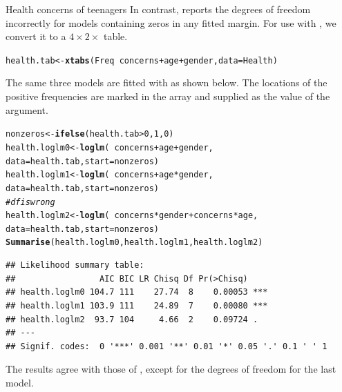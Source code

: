 \documentclass[11pt]{book}\usepackage[]{graphicx}\usepackage[]{color}
\makeatletter
\newcommand{\hlnum}[1]{\textcolor[rgb]{0.686,0.059,0.569}{#1}}%
\newcommand{\hlcom}[1]{\textcolor[rgb]{0.678,0.584,0.686}{\textit{#1}}}%
\newcommand{\hlopt}[1]{\textcolor[rgb]{0,0,0}{#1}}%
\newcommand{\hlstd}[1]{\textcolor[rgb]{0.345,0.345,0.345}{#1}}%
\newcommand{\hlkwb}[1]{\textcolor[rgb]{0.69,0.353,0.396}{#1}}%
\newcommand{\hlkwc}[1]{\textcolor[rgb]{0.333,0.667,0.333}{#1}}%
\newcommand{\hlkwd}[1]{\textcolor[rgb]{0.737,0.353,0.396}{\textbf{#1}}}%
\newenvironment{kframe}{%
 \def\at@end@of@kframe{}%
 \ifinner\ifhmode%
  \def\at@end@of@kframe{\end{minipage}}%
  \begin{minipage}{\columnwidth}%
 \fi\fi%
 \def\FrameCommand##1{\hskip\@totalleftmargin \hskip-\fboxsep
 \colorbox{shadecolor}{##1}\hskip-\fboxsep
     \hskip-\linewidth \hskip-\@totalleftmargin \hskip\columnwidth}%
 \MakeFramed {\advance\hsize-\width
   \@totalleftmargin\z@ \linewidth\hsize
   \@setminipage}}%
 {\par\unskip\endMakeFramed%
 \at@end@of@kframe}
\newenvironment{knitrout}{}{} %
\renewenvironment{knitrout}{\small\renewcommand{\baselinestretch}{.85}}{} %
\makeatother
\begin{document}
\begin{Example}[health]{Health concerns of teenagers}
In contrast,  reports the degrees of freedom incorrectly for
models containing zeros in any fitted margin.
For use with ,  we convert it to a $4 \times 2 \times$ table.
\begin{knitrout}
\color{fgcolor}\begin{kframe}
\begin{alltt}
\hlstd{health.tab} \hlkwb{<-} \hlkwd{xtabs}\hlstd{(Freq} \hlopt{~} \hlstd{concerns} \hlopt{+} \hlstd{age} \hlopt{+} \hlstd{gender,} \hlkwc{data} \hlstd{= Health)}
\end{alltt}
\end{kframe}
\end{knitrout}
The same three models are fitted with  as shown below.
The locations of the positive frequencies are marked in the
array  and supplied as the value of the
 argument. 
\begin{knitrout}
\color{fgcolor}\begin{kframe}
\begin{alltt}
\hlstd{nonzeros} \hlkwb{<-} \hlkwd{ifelse}\hlstd{(health.tab}\hlopt{>}\hlnum{0}\hlstd{,} \hlnum{1}\hlstd{,} \hlnum{0}\hlstd{)}
\hlstd{health.loglm0} \hlkwb{<-} \hlkwd{loglm}\hlstd{(}\hlopt{~} \hlstd{concerns} \hlopt{+} \hlstd{age} \hlopt{+} \hlstd{gender,}
              \hlkwc{data} \hlstd{= health.tab,} \hlkwc{start} \hlstd{= nonzeros)}
\hlstd{health.loglm1} \hlkwb{<-} \hlkwd{loglm}\hlstd{(}\hlopt{~} \hlstd{concerns} \hlopt{+} \hlstd{age} \hlopt{*} \hlstd{gender,}
              \hlkwc{data} \hlstd{= health.tab,} \hlkwc{start} \hlstd{= nonzeros)}
\hlcom{# df is wrong}
\hlstd{health.loglm2} \hlkwb{<-} \hlkwd{loglm}\hlstd{(}\hlopt{~} \hlstd{concerns}\hlopt{*}\hlstd{gender} \hlopt{+} \hlstd{concerns}\hlopt{*}\hlstd{age,}
              \hlkwc{data} \hlstd{= health.tab,} \hlkwc{start} \hlstd{= nonzeros)}
\hlkwd{Summarise}\hlstd{(health.loglm0, health.loglm1, health.loglm2)}
\end{alltt}
\begin{verbatim}
## Likelihood summary table:
##                 AIC BIC LR Chisq Df Pr(>Chisq)    
## health.loglm0 104.7 111    27.74  8    0.00053 ***
## health.loglm1 103.9 111    24.89  7    0.00080 ***
## health.loglm2  93.7 104     4.66  2    0.09724 .  
## ---
## Signif. codes:  0 '***' 0.001 '**' 0.01 '*' 0.05 '.' 0.1 ' ' 1
\end{verbatim}
\end{kframe}
\end{knitrout}

The results agree with those of , except for the degrees of freedom
for the last model.

\end{Example}
\end{document}
